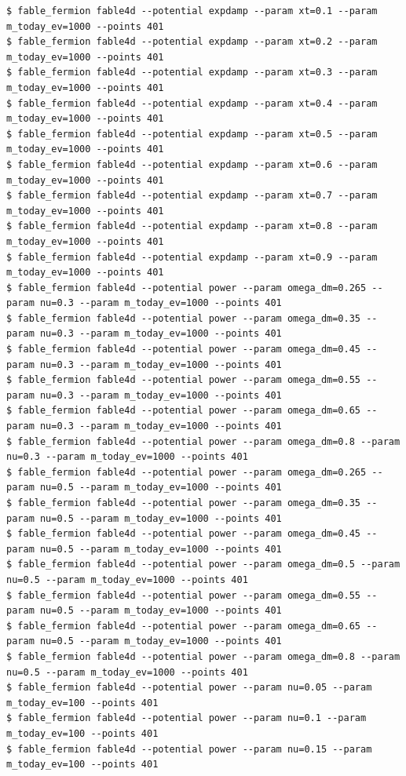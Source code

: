 \begin{Verbatim}
$ fable_fermion fable4d --potential expdamp --param xt=0.1 --param m_today_ev=1000 --points 401
$ fable_fermion fable4d --potential expdamp --param xt=0.2 --param m_today_ev=1000 --points 401
$ fable_fermion fable4d --potential expdamp --param xt=0.3 --param m_today_ev=1000 --points 401
$ fable_fermion fable4d --potential expdamp --param xt=0.4 --param m_today_ev=1000 --points 401
$ fable_fermion fable4d --potential expdamp --param xt=0.5 --param m_today_ev=1000 --points 401
$ fable_fermion fable4d --potential expdamp --param xt=0.6 --param m_today_ev=1000 --points 401
$ fable_fermion fable4d --potential expdamp --param xt=0.7 --param m_today_ev=1000 --points 401
$ fable_fermion fable4d --potential expdamp --param xt=0.8 --param m_today_ev=1000 --points 401
$ fable_fermion fable4d --potential expdamp --param xt=0.9 --param m_today_ev=1000 --points 401
$ fable_fermion fable4d --potential power --param omega_dm=0.265 --param nu=0.3 --param m_today_ev=1000 --points 401
$ fable_fermion fable4d --potential power --param omega_dm=0.35 --param nu=0.3 --param m_today_ev=1000 --points 401
$ fable_fermion fable4d --potential power --param omega_dm=0.45 --param nu=0.3 --param m_today_ev=1000 --points 401
$ fable_fermion fable4d --potential power --param omega_dm=0.55 --param nu=0.3 --param m_today_ev=1000 --points 401
$ fable_fermion fable4d --potential power --param omega_dm=0.65 --param nu=0.3 --param m_today_ev=1000 --points 401
$ fable_fermion fable4d --potential power --param omega_dm=0.8 --param nu=0.3 --param m_today_ev=1000 --points 401
$ fable_fermion fable4d --potential power --param omega_dm=0.265 --param nu=0.5 --param m_today_ev=1000 --points 401
$ fable_fermion fable4d --potential power --param omega_dm=0.35 --param nu=0.5 --param m_today_ev=1000 --points 401
$ fable_fermion fable4d --potential power --param omega_dm=0.45 --param nu=0.5 --param m_today_ev=1000 --points 401
$ fable_fermion fable4d --potential power --param omega_dm=0.5 --param nu=0.5 --param m_today_ev=1000 --points 401
$ fable_fermion fable4d --potential power --param omega_dm=0.55 --param nu=0.5 --param m_today_ev=1000 --points 401
$ fable_fermion fable4d --potential power --param omega_dm=0.65 --param nu=0.5 --param m_today_ev=1000 --points 401
$ fable_fermion fable4d --potential power --param omega_dm=0.8 --param nu=0.5 --param m_today_ev=1000 --points 401
$ fable_fermion fable4d --potential power --param nu=0.05 --param m_today_ev=100 --points 401
$ fable_fermion fable4d --potential power --param nu=0.1 --param m_today_ev=100 --points 401
$ fable_fermion fable4d --potential power --param nu=0.15 --param m_today_ev=100 --points 401

\end{Verbatim}
